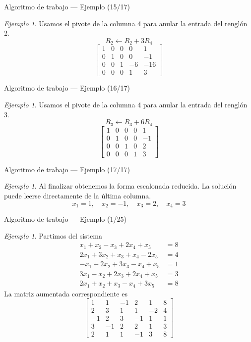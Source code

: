 \documentclass[aspectratio=169,11pt]{beamer}
\theoremstyle{remark}
\newtheorem{Ejem}[definicion]{Ejemplo}
\begin{document}
\begin{frame}{Algoritmo de trabajo — Ejemplo (15/17)}
\begin{Ejem}
Usamos el pivote de la columna 4 para anular la entrada del renglón 2.
\[
R_{2}\leftarrow R_{2}+3R_{4}
\]
\[
\left[\begin{array}{cccc|c}
1 & 0 & 0 & 0 & 1\\
0 & 1 & 0 & 0 & -1\\
0 & 0 & 1 & -6 & -16\\
0 & 0 & 0 & 1 & 3
\end{array}\right]
\]
\end{Ejem}
\end{frame}

\begin{frame}{Algoritmo de trabajo — Ejemplo (16/17)}
\begin{Ejem}
Usamos el pivote de la columna 4 para anular la entrada del renglón 3.
\[
R_{3}\leftarrow R_{3}+6R_{4}
\]
\[
\left[\begin{array}{cccc|c}
1 & 0 & 0 & 0 & 1\\
0 & 1 & 0 & 0 & -1\\
0 & 0 & 1 & 0 & 2\\
0 & 0 & 0 & 1 & 3
\end{array}\right]
\]
\end{Ejem}
\end{frame}

\begin{frame}{Algoritmo de trabajo — Ejemplo (17/17)}
\begin{Ejem}
Al finalizar obtenemos la forma escalonada reducida. La solución puede leerse directamente de la última columna.
\[
\boxed{x_{1}=1,\quad x_{2}=-1,\quad x_{3}=2,\quad x_{4}=3}
\]
\end{Ejem}
\end{frame}

\begin{frame}{Algoritmo de trabajo — Ejemplo (1/25)}
\begin{Ejem}
Partimos del sistema
\[
\begin{aligned}
x_{1} + x_{2} - x_{3} + 2 x_{4} + x_{5} &= 8\\
2 x_{1} + 3 x_{2} + x_{3} + x_{4} - 2 x_{5} &= 4\\
- x_{1} + 2 x_{2} + 3 x_{3} - x_{4} + x_{5} &= 1\\
3 x_{1} - x_{2} + 2 x_{3} + 2 x_{4} + x_{5} &= 3\\
2 x_{1} + x_{2} + x_{3} - x_{4} + 3 x_{5} &= 8
\end{aligned}
\]
La matriz aumentada correspondiente es
\[
\left[\begin{array}{ccccc|c}
1 & 1 & -1 & 2 & 1 & 8\\
2 & 3 & 1 & 1 & -2 & 4\\
-1 & 2 & 3 & -1 & 1 & 1\\
3 & -1 & 2 & 2 & 1 & 3\\
2 & 1 & 1 & -1 & 3 & 8
\end{array}\right]
\]
\end{Ejem}
\end{frame}
\end{document}
